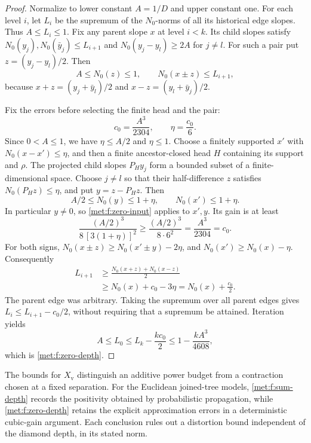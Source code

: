 \begin{proof}
Normalize to lower constant $A=1/D$ and upper constant one.
For each level $i$, let $L_i$ be the supremum of the $N_0$-norms
of all its historical edge slopes.  Thus $A\le L_i\le1$.
Fix any parent slope $x$ at level $i<k$.  Its child slopes satisfy
$N_0(y_j),N_0(\bar y_j)\le L_{i+1}$ and
$N_0(y_j-y_l)\ge2A$ for $j\ne l$.
For such a pair put $z=(y_j-y_l)/2$.  Then
\begin{equation}\label{met:f:zero-pair}
 A\le N_0(z)\le1,
 \qquad N_0(x\pm z)\le L_{i+1},
\end{equation}
because $x+z=(y_j+\bar y_l)/2$ and
$x-z=(y_l+\bar y_j)/2$.

Fix the errors before selecting the finite head and the pair:
\[
 c_0=\frac{A^3}{2304},\qquad
 \eta=\frac{c_0}{6}.
\]
Since $0<A\le1$, we have $\eta\le A/2$ and $\eta\le1$.
Choose a finitely supported $x'$ with $N_0(x-x')\le\eta$, and
then a finite ancestor-closed head $H$ containing its support and
$\rho$.  The projected child slopes $P_Hy_j$ form a bounded subset
of a finite-dimensional space.  Choose $j\ne l$ so that their
half-difference $z$ satisfies $N_0(P_Hz)\le\eta$, and put
$y=z-P_Hz$.  Then
\[
 A/2\le N_0(y)\le1+\eta,
 \qquad N_0(x')\le1+\eta.
\]
In particular $y\ne0$, so \eqref{met:f:zero-input} applies to
$x',y$.  Its gain is at least
\[
 \frac{(A/2)^3}{8\,[3(1+\eta)]^2}
 \ge\frac{(A/2)^3}{8\cdot6^2}
 =\frac{A^3}{2304}=c_0.
\]
For both signs,
$N_0(x\pm z)\ge N_0(x'\pm y)-2\eta$,
and $N_0(x')\ge N_0(x)-\eta$.  Consequently
\[
 \begin{split}
 L_{i+1}
 &\ge\frac{N_0(x+z)+N_0(x-z)}2\\
 &\ge N_0(x)+c_0-3\eta
  =N_0(x)+\frac{c_0}{2}.
 \end{split}
\]
The parent edge was arbitrary.  Taking the supremum over all parent
edges gives $L_i\le L_{i+1}-c_0/2$, without requiring that a
supremum be attained.  Iteration yields
\[
 A\le L_0\le L_k-\frac{kc_0}{2}
 \le1-\frac{kA^3}{4608},
\]
which is \eqref{met:f:zero-depth}.
\end{proof}

The bounds for $X_{\mathrm v}$ distinguish an additive power budget
from a contraction chosen at a fixed separation. For the Euclidean
joined-tree models, \eqref{met:f:sum-depth} records the positivity
obtained by probabilistic propagation, while
\eqref{met:f:zero-depth} retains the explicit approximation errors
in a deterministic cubic-gain argument. Each conclusion rules out a
distortion bound independent of the diamond depth, in its stated norm.
